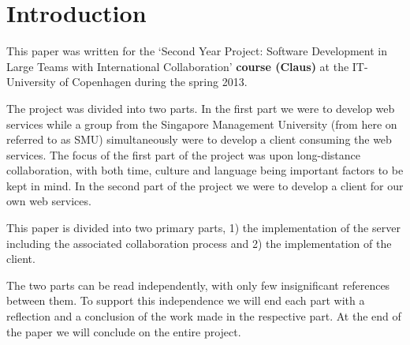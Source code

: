 \section{Introduction}
This paper was written for the `Second Year Project: Software Development in Large Teams with International Collaboration' \textbf{course (Claus)} at the IT-University of Copenhagen during the spring 2013.

The project was divided into two parts. In the first part we were to develop web services while a group from the Singapore Management University (from here on referred to as SMU) simultaneously were to develop a client consuming the web services.
The focus of the first part of the project was upon long-distance collaboration, with both time, culture and language being important factors to be kept in mind.
In the second part of the project we were to develop a client for our own web services.

This paper is divided into two primary parts, 1) the implementation of the server including the associated collaboration process and 2) the implementation of the client.

The two parts can be read independently, with only few insignificant references between them. To support this independence we will end each part with a reflection and a conclusion of the work made in the respective part.
At the end of the paper we will conclude on the entire project.
\newpage